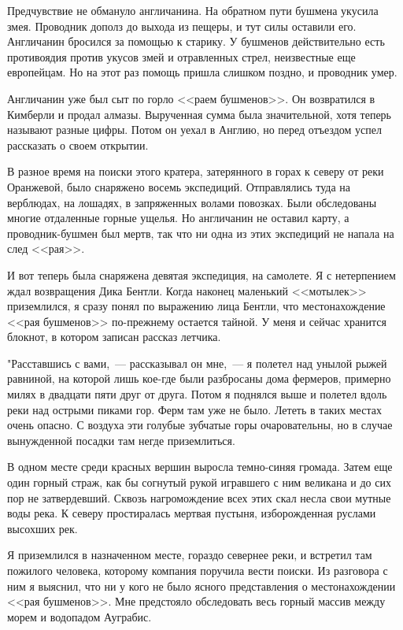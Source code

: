 \documentclass[12pt,a4paper,twoside,openany,svgnames]{memoir}
\begin{document}
Предчувствие не обмануло англичанина. На обратном пути бушмена укусила змея. Проводник дополз до выхода из пещеры, и тут силы оставили его. Англичанин бросился за помощью к старику. У бушменов действительно есть противоядия против укусов змей и отравленных стрел, неизвестные еще европейцам. Но на этот раз помощь пришла слишком поздно, и проводник умер.

Англичанин уже был сыт по горло <<раем бушменов>>. Он возвратился в Кимберли и продал алмазы. Вырученная сумма была значительной, хотя теперь называют разные цифры. Потом он уехал в Англию, но перед отъездом успел рассказать о своем открытии.

В разное время на поиски этого кратера, затерянного в горах к северу от реки Оранжевой, было снаряжено восемь экспедиций. Отправлялись туда на верблюдах, на лошадях, в запряженных волами повозках. Были обследованы многие отдаленные горные ущелья. Но англичанин не оставил карту, а проводник-бушмен был мертв, так что ни одна из этих экспедиций не напала на след <<рая>>.

И вот теперь была снаряжена девятая экспедиция, на самолете. Я с нетерпением ждал возвращения Дика Бентли. Когда наконец маленький <<мотылек>> приземлился, я сразу понял по выражению лица Бентли, что местонахождение <<рая бушменов>> по-прежнему остается тайной. У меня и сейчас хранится блокнот, в котором записан рассказ летчика.

"Расставшись с вами,~--- рассказывал он мне,~--- я полетел над унылой рыжей равниной, на которой лишь кое-где были разбросаны дома фермеров, примерно милях в двадцати пяти друг от друга. Потом я поднялся выше и полетел вдоль реки над острыми пиками гор. Ферм там уже не было. Лететь в таких местах очень опасно. С воздуха эти голубые зубчатые горы очаровательны, но в случае вынужденной посадки там негде приземлиться.

В одном месте среди красных вершин выросла темно-синяя громада. Затем еще один горный страж, как бы согнутый рукой игравшего с ним великана и до сих пор не затвердевший. Сквозь нагромождение всех этих скал несла свои мутные воды река. К северу простиралась мертвая пустыня, изборожденная руслами высохших рек.

Я приземлился в назначенном месте, гораздо севернее реки, и встретил там пожилого человека, которому компания поручила вести поиски. Из разговора с ним я выяснил, что ни у кого не было ясного представления о местонахождении <<рая бушменов>>. Мне предстояло обследовать весь горный массив между морем и водопадом Ауграбис.
\end{document}
